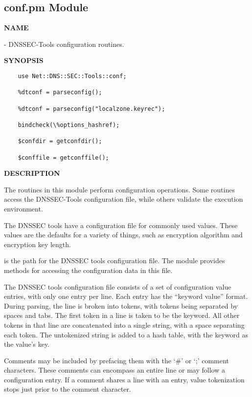 \clearpage

\subsection{\bf conf.pm Module}

{\bf NAME}

 - DNSSEC-Tools configuration routines.

{\bf SYNOPSIS}

\begin{verbatim}
    use Net::DNS::SEC::Tools::conf;

    %dtconf = parseconfig();

    %dtconf = parseconfig("localzone.keyrec");

    bindcheck(\%options_hashref);

    $confdir = getconfdir();

    $conffile = getconffile();
\end{verbatim}

{\bf DESCRIPTION}

The routines in this module perform configuration operations.  Some routines
access the DNSSEC-Tools configuration file, while others validate the
execution environment.

The DNSSEC tools have a configuration file for commonly used values.  These
values are the defaults for a variety of things, such as encryption algorithm
and encryption key length.

 is the path for the DNSSEC
tools configuration file.  The  module
provides methods for accessing the configuration data in this file.

The DNSSEC tools configuration file consists of a set of configuration value
entries, with only one entry per line.  Each entry has the ``keyword value''
format.  During parsing, the line is broken into tokens, with tokens being
separated by spaces and tabs.  The first token in a line is taken to be the
keyword.  All other tokens in that line are concatenated into a single string,
with a space separating each token.  The untokenized string is added to a hash
table, with the keyword as the value's key.

Comments may be included by prefacing them with the `\#' or `;' comment
characters.  These comments can encompass an entire line or may follow a
configuration entry.  If a comment shares a line with an entry, value
tokenization stops just prior to the comment character.

